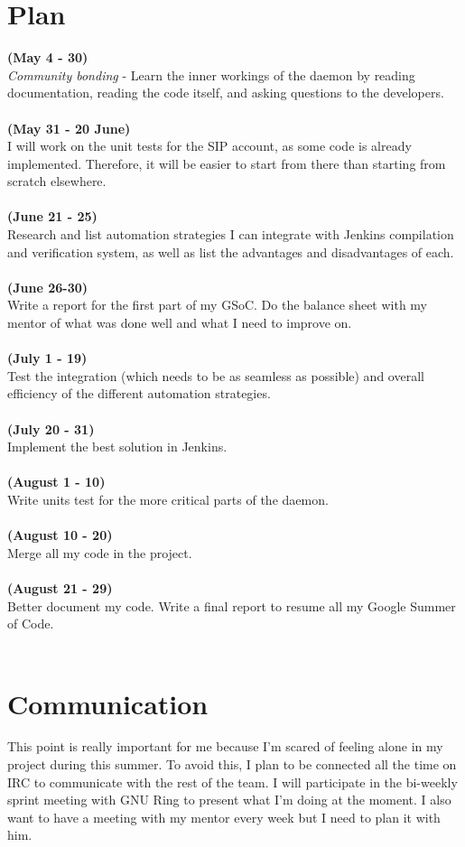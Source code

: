 \documentclass{article}
\begin{document}
\section{Plan}
\textbf{(May 4 - 30)}\\
\textit{Community bonding} - Learn the inner workings of the daemon by reading documentation, reading the code itself, and asking questions to the developers.\\ \\
\textbf{(May 31 - 20 June)} \\ I will work on the unit tests for the SIP account, as some code is already implemented. Therefore, it will be easier to start from there than starting from scratch elsewhere.\\ \\
\textbf{(June 21 - 25)} \\ Research and list automation strategies I can integrate with Jenkins compilation and verification system, as well as list the advantages and disadvantages of each. \\ \\
\textbf{(June 26-30)}\\ Write a report for the first part of my GSoC. Do the balance sheet with my mentor of what was done well  and what I need to improve on. \\ \\
\textbf{(July 1 - 19)}\\ Test the integration (which  needs to be as seamless as possible) and overall efficiency of the different automation strategies. \\ \\
\textbf{(July 20 - 31)}\\ Implement the best solution in Jenkins. \\ \\
\textbf{(August 1 - 10)}\\ Write units test for the more critical parts of the daemon. \\ \\
\textbf{(August 10 - 20)}\\ Merge all my code in the project. \\ \\
\textbf{(August 21 - 29)}\\ Better document my code. Write a final report to resume all my Google Summer of Code. \\ \\

\section{Communication}
This point is really important for me because I’m scared of feeling alone in my project during this summer. To avoid this, I plan to be connected all the time on IRC to communicate with the rest of the team. I will participate in the bi-weekly sprint meeting with GNU Ring to present what I’m doing at the moment. I also want to have a meeting with my mentor every week but I need to plan it with him.
\end{document}
